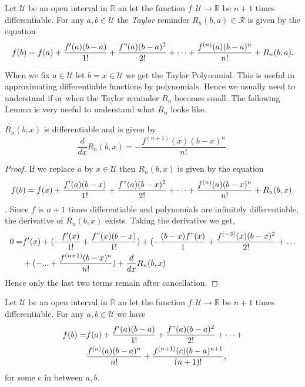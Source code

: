 \begin{Definition}
    Let $\mathcal{U}$ be an open interval in $\mathbb{R}$ an let the function $f: \mathcal{U} \to
    \mathbb{R}$ be $n + 1$ times differentiable. For any $a,b \in \mathcal{U}$ the \emph{Taylor}
    reminder $R_n(b,a) \in \mathcal{R}$ is given by the equation
    \[ f(b) = f(a) + \frac{f'(a)(b-a)}{1!} + \frac{f"(a)(b-a)^2}{2!} + \dots +
	\frac{f^{(n)}(a)(b-a)^n}{n!} + R_n(b,a).\]
\end{Definition}
When we fix $a \in \mathcal{U}$ let $b = x \in \mathcal{U}$ we get the Taylor Polynomial. This is
useful in approximating differentiable functions by polynomials. Hence we usually need to understand
if or when the Taylor reminder $R_n$ becomes small. The following Lemma is very useful to understand
what $R_n$ looks like.
\begin{Lemma}
    $R_n(b,x)$ is differentiable and is given by 
    \[ \frac{d}{dx}R_n(b,x) = -\frac{f^{(n+1)}(x)(b-x)^n}{n!} .\]
\end{Lemma}
\begin{proof}
    If we replace $a$ by $x \in \mathcal{U}$ then $R_n(b,x)$ is given by the equation
    \[ f(b) = f(x) + \frac{f'(a)(b-x)}{1!} + \frac{f"(a)(b-x)^2}{2!} + \dots +
	\frac{f^{(n)}(a)(b-x)^n}{n!} + R_n(b,x).\]. Since $f$ is $n+1$ times differentiable and
    polynomials are infinitely differentiable, the derivative of $R_n(b,x)$ exists. 
    Taking the derivative we get,
    \begin{displaymath}
	\begin{aligned}
	    0 = & f'(x) + (-\frac{f'(x)}{1!} + \frac{f"(x)(b-x)}{1!}) + (-\frac{(b-x)f"(x)}{1} + 
	    \frac{f^{(-3)}(x)(b-x)^2}{2!} + \dots \\ 
	    & + (- ... + \frac{f^{(n+1)}(b-x)^n}{n!}) + \frac{d}{dx}R_n(b,x)
	\end{aligned}
    \end{displaymath}
    Hence only the last two terms remain after cancellation.
\end{proof}
\begin{Theorem}[name=Taylor's Theorem]
   Let $\mathcal{U}$ be an open interval in $\mathbb{R}$ an let the function $f: \mathcal{U} \to
    \mathbb{R}$ be $n + 1$ times differentiable. For any $a,b \in \mathcal{U}$ we have
    \begin{displaymath}
	\begin{aligned}
	    f(b) = & f(a) + \frac{f'(a)(b-a)}{1!} + \frac{f"(a)(b-a)^2}{2!} + \dots +  \\
	    & \frac{f^{(n)}(a)(b-a)^n}{n!} + \frac{f^{(n+1)}(c)(b-a)^{n+1}}{(n+1)!},
	\end{aligned}
    \end{displaymath}
    for some c in between $a,b$.
\end{Theorem}
